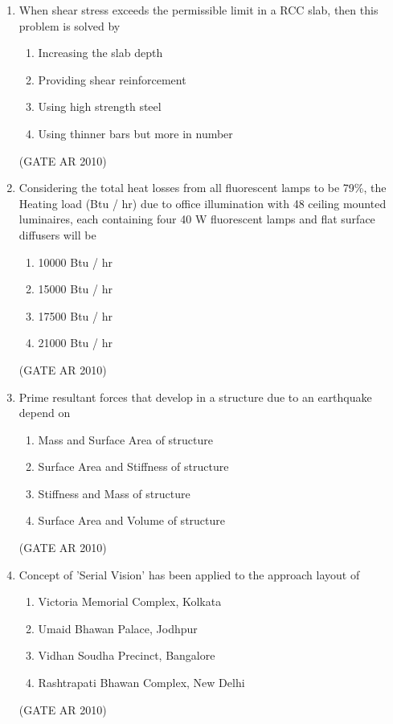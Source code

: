 \documentclass[journal]{IEEEtran}
\begin{document}
\begin{enumerate}
\item When shear stress exceeds the permissible limit in a RCC slab, then this problem is solved by
\begin{multicols}{2}
\begin{enumerate}
\item Increasing the slab depth
\item Providing shear reinforcement
\item Using high strength steel
\item Using thinner bars but more in number
\end{enumerate}
\end{multicols}
\hfill (GATE AR 2010)

\item Considering the total heat losses from all fluorescent lamps to be 79\%, the Heating load (Btu / hr) due to office illumination with 48 ceiling mounted luminaires, each containing four 40 W fluorescent lamps and flat surface diffusers will be
\begin{multicols}{2}
\begin{enumerate}
\item 10000 Btu / hr
\item 15000 Btu / hr
\item 17500 Btu / hr
\item 21000 Btu / hr
\end{enumerate}
\end{multicols}
\hfill (GATE AR 2010)

\item Prime resultant forces that develop in a structure due to an earthquake depend on
\begin{enumerate}
\item Mass and Surface Area of structure
\item Surface Area and Stiffness of structure
\item Stiffness and Mass of structure
\item Surface Area and Volume of structure
\end{enumerate}
\hfill (GATE AR 2010)

\item Concept of 'Serial Vision' has been applied to the approach layout of
\begin{multicols}{2}
\begin{enumerate}
\item Victoria Memorial Complex, Kolkata
\item Umaid Bhawan Palace, Jodhpur
\item Vidhan Soudha Precinct, Bangalore
\item Rashtrapati Bhawan Complex, New Delhi
\end{enumerate}
\end{multicols}
\hfill (GATE AR 2010)


\end{enumerate}
\end{document}
